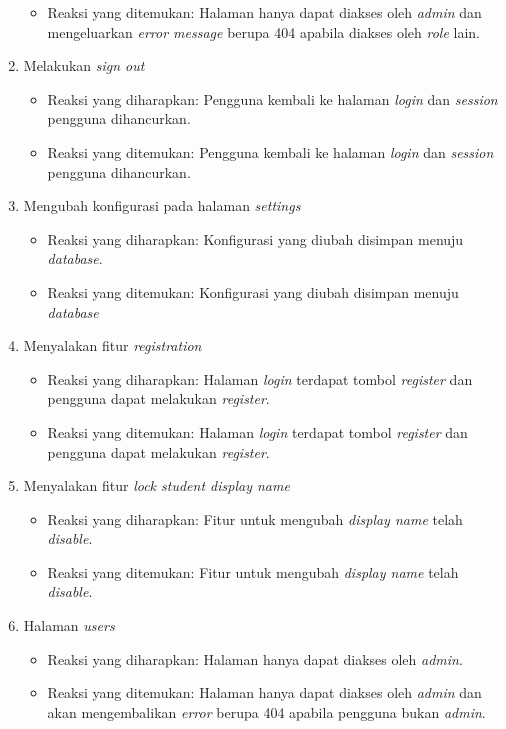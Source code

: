 \begin{enumerate}
\begin{itemize}
	 	\item Reaksi yang ditemukan: Halaman hanya dapat diakses oleh \textit{admin} dan mengeluarkan \textit{error message} berupa 404 apabila diakses oleh \textit{role} lain.
	 \end{itemize}
	 \item Melakukan \textit{sign out}
	 \begin{itemize}
	 	\item Reaksi yang diharapkan: Pengguna kembali ke halaman \textit{login} dan \textit{session} pengguna dihancurkan.
	 	\item Reaksi yang ditemukan: Pengguna kembali ke halaman \textit{login} dan \textit{session} pengguna dihancurkan.
	 \end{itemize}
	 \item Mengubah konfigurasi pada halaman \textit{settings}
	 \begin{itemize}
	 	\item Reaksi yang diharapkan: Konfigurasi yang diubah disimpan menuju \textit{database}.
	 	\item Reaksi yang ditemukan: Konfigurasi yang diubah disimpan menuju \textit{database}
	 \end{itemize}
	 \item Menyalakan fitur \textit{registration}
	 \begin{itemize}
	 	\item Reaksi yang diharapkan: Halaman \textit{login} terdapat tombol \textit{register} dan pengguna dapat melakukan \textit{register}.
	 	\item Reaksi yang ditemukan: Halaman \textit{login} terdapat tombol \textit{register} dan pengguna dapat melakukan \textit{register}.
	 \end{itemize}
	 \item Menyalakan fitur \textit{lock student display name}
	 \begin{itemize}
	 	\item Reaksi yang diharapkan: Fitur untuk mengubah \textit{display name} telah \textit{disable}.
	 	\item Reaksi yang ditemukan: Fitur untuk mengubah \textit{display name} telah \textit{disable}.
	 \end{itemize}
	 \item Halaman \textit{users}
	 \begin{itemize}
	 	\item Reaksi yang diharapkan: Halaman hanya dapat diakses oleh \textit{admin}.
	 	\item Reaksi yang ditemukan: Halaman hanya dapat diakses oleh \textit{admin} dan akan mengembalikan \textit{error} berupa 404 apabila pengguna bukan \textit{admin}.

\end{itemize}
\end{enumerate}
